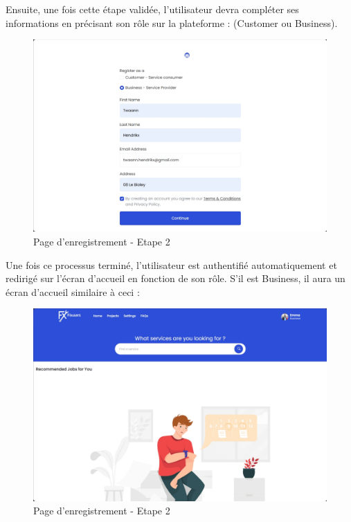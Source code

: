 {Ensuite, une fois cette étape validée, l'utilisateur devra compléter ses informations en précisant son rôle sur la plateforme : (Customer ou Business).

\begin{figure}[H]
\begin{center}
\includegraphics[width=12cm]{assets/demo/signup-2.png}
\end{center}
\caption{Page d'enregistrement - Etape 2}
\end{figure}

Une fois ce processus terminé, l'utilisateur est authentifié automatiquement et redirigé sur l'écran d'accueil en fonction de son rôle. S'il est Business, il aura un écran d'accueil similaire à ceci :

\vspace{0.35cm}
\begin{figure}[H]
\begin{center}
\includegraphics[width=12cm]{assets/demo/sp1.png}
\end{center}
\caption{Page d'enregistrement - Etape 2}
\end{figure}

}
